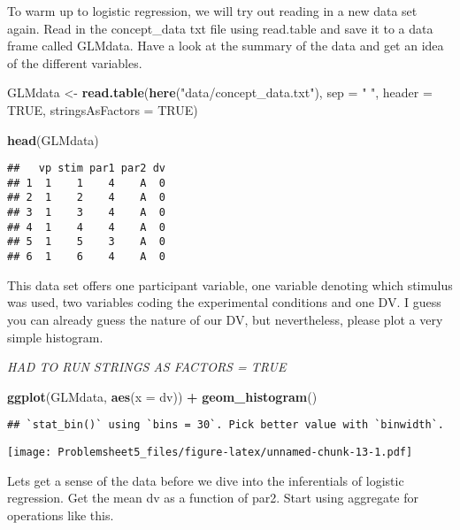 \documentclass[
]{article}
\newenvironment{Shaded}{\begin{snugshade}}{\end{snugshade}}
\newcommand{\DataTypeTok}[1]{\textcolor[rgb]{0.13,0.29,0.53}{#1}}
\newcommand{\KeywordTok}[1]{\textcolor[rgb]{0.13,0.29,0.53}{\textbf{#1}}}
\newcommand{\NormalTok}[1]{#1}
\newcommand{\OperatorTok}[1]{\textcolor[rgb]{0.81,0.36,0.00}{\textbf{#1}}}
\newcommand{\OtherTok}[1]{\textcolor[rgb]{0.56,0.35,0.01}{#1}}
\newcommand{\StringTok}[1]{\textcolor[rgb]{0.31,0.60,0.02}{#1}}
\begin{document}
To warm up to logistic regression, we will try out reading in a new data
set again. Read in the concept\_data txt file using read.table and save
it to a data frame called GLMdata. Have a look at the summary of the
data and get an idea of the different variables.

\begin{Shaded}
\begin{Highlighting}[]
\NormalTok{GLMdata <-}\StringTok{ }\KeywordTok{read.table}\NormalTok{(}\KeywordTok{here}\NormalTok{(}\StringTok{"data/concept_data.txt"}\NormalTok{), }\DataTypeTok{sep =} \StringTok{" "}\NormalTok{, }\DataTypeTok{header =} \OtherTok{TRUE}\NormalTok{, }\DataTypeTok{stringsAsFactors =} \OtherTok{TRUE}\NormalTok{)}

\KeywordTok{head}\NormalTok{(GLMdata)}
\end{Highlighting}
\end{Shaded}

\begin{verbatim}
##   vp stim par1 par2 dv
## 1  1    1    4    A  0
## 2  1    2    4    A  0
## 3  1    3    4    A  0
## 4  1    4    4    A  0
## 5  1    5    3    A  0
## 6  1    6    4    A  0
\end{verbatim}

This data set offers one participant variable, one variable denoting
which stimulus was used, two variables coding the experimental
conditions and one DV. I guess you can already guess the nature of our
DV, but nevertheless, please plot a very simple histogram.

\emph{HAD TO RUN STRINGS AS FACTORS = TRUE}

\begin{Shaded}
\begin{Highlighting}[]
\KeywordTok{ggplot}\NormalTok{(GLMdata, }\KeywordTok{aes}\NormalTok{(}\DataTypeTok{x =}\NormalTok{ dv)) }\OperatorTok{+}\StringTok{ }\KeywordTok{geom_histogram}\NormalTok{()}
\end{Highlighting}
\end{Shaded}

\begin{verbatim}
## `stat_bin()` using `bins = 30`. Pick better value with `binwidth`.
\end{verbatim}

\texttt{[image: Problemsheet5\_files/figure-latex/unnamed-chunk-13-1.pdf]}

Lets get a sense of the data before we dive into the inferentials of
logistic regression. Get the mean dv as a function of par2. Start using
aggregate for operations like this.
\end{document}
